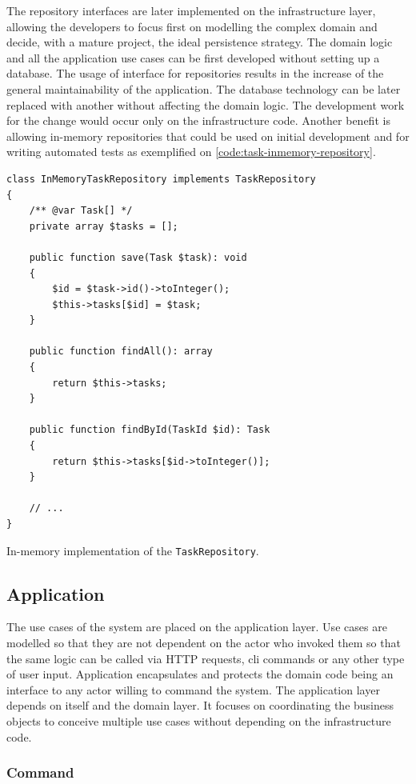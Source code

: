 The repository interfaces are later implemented on the infrastructure layer, allowing the developers to focus first on modelling the complex domain and decide, with a mature project, the ideal persistence strategy. The domain logic and all the application use cases can be first developed without setting up a database. The usage of interface for repositories results in the increase of the general maintainability of the application. The database technology can be later replaced with another without affecting the domain logic. The development work for the change would occur only on the infrastructure code. Another benefit is allowing in-memory repositories that could be used on initial development and for writing automated tests as exemplified on \autoref{code:task-inmemory-repository}.

\begin{listing}[htbp]
\begin{verbatim}
class InMemoryTaskRepository implements TaskRepository
{
	/** @var Task[] */
	private array $tasks = [];

	public function save(Task $task): void
	{
		$id = $task->id()->toInteger();
		$this->tasks[$id] = $task;
	}

	public function findAll(): array
	{
		return $this->tasks;
	}

	public function findById(TaskId $id): Task
	{
		return $this->tasks[$id->toInteger()];
	}

	// ...
}
\end{verbatim}
\caption{In-memory implementation of the \texttt{TaskRepository}.}
\label{code:task-inmemory-repository}
\end{listing}

\subsection{Application}

The use cases of the system are placed on the application layer. Use cases are modelled so that they are not dependent on the actor who invoked them so that the same logic can be called via HTTP requests, \acrshort{cli} commands or any other type of user input. Application encapsulates and protects the domain code being an interface to any actor willing to command the system. The application layer depends on itself and the domain layer. It focuses on coordinating the business objects to conceive multiple use cases without depending on the infrastructure code.

\subsubsection{Command}
\label{sec:command}

